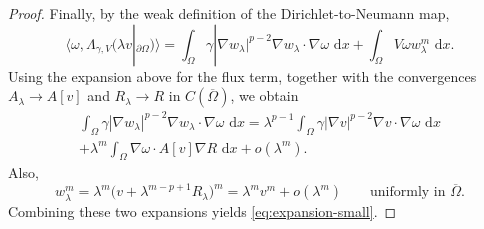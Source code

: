 \documentclass[10pt,a4paper]{amsart}
\newcommand{\dd}{\,\mathrm{d}}
\newcommand{\la}{\langle}
\newcommand{\pr}{\partial}
\newcommand{\ra}{\rangle}
\begin{document}
\begin{proof}
Finally, by the weak definition of the Dirichlet-to-Neumann map,
\[
\la\omega,\Lambda_{\gamma,V}(\lambda v|_{\pr\Omega})\ra
=\int_\Omega \gamma|\nabla w_\lambda|^{p-2}\nabla w_\lambda\cdot\nabla\omega\,\dd x
+\int_\Omega V\omega w_\lambda^m\,\dd x.
\]
Using the expansion above for the flux term, together with the convergences $A_\lambda\to A[v]$ and $R_\lambda\to R$ in $C(\overline\Omega)$, we obtain
\begin{multline*}
\int_\Omega \gamma|\nabla w_\lambda|^{p-2}\nabla w_\lambda\cdot\nabla\omega\,\dd x
=\lambda^{p-1}\int_\Omega \gamma|\nabla v|^{p-2}\nabla v\cdot\nabla\omega\,\dd x\\[5pt]
+\lambda^m\int_\Omega \nabla\omega\cdot A[v]\nabla R\,\dd x+o(\lambda^m).
\end{multline*}
Also,
\[
w_\lambda^m=\lambda^m\bigl(v+\lambda^{m-p+1}R_\lambda\bigr)^m
=\lambda^m v^m+o(\lambda^m)
\qquad\text{uniformly in }\overline\Omega.
\]
Combining these two expansions yields \eqref{eq:expansion-small}.
\end{proof}
\end{document}
